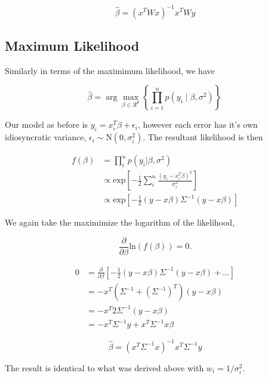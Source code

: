 \documentclass[12pt]{article}
\begin{document}
        \begin{equation}
            \hat{\beta} = (x^T W x)^{-1} x^T W y
        \end{equation}

        \subsection*{Maximum Likelihood}

        Similarly in terms of the maximimum likelihood, we have

        \begin{equation}
            \hat{\beta} = \arg \max_{\beta \in \mathcal{R}^p} \left\{ \prod_{i=1}^n p(y_i \mid \beta, \sigma^2) \right\} \,
        \end{equation}

        Our model as before is $y_i = x_i^T \beta + \epsilon_i$, however each error has it's own idiosyncratic variance, $\epsilon_i \sim \text{N}(0, \sigma_i^2)$. The resultant likelihood is then 

        \begin{align}
            f(\beta) &= \prod_i^n p(y_i|\beta, \sigma^2) \\
             & \propto \text{exp}\left [ -\frac{1}{2} \sum_i^n \frac{(y_i - x_i^T \beta)^2}{\sigma_i^2} \right] \\
             & \propto \text{exp} \left [ -\frac{1}{2}(y - x\beta) \Sigma^{-1} (y - x\beta) \right]
        \end{align}

        We again take the maximimize the logarithm of the likelihood, 

        \begin{equation}
            \frac{\partial}{\partial \beta}\text{ln}(f(\beta)) = 0.
        \end{equation}

        \begin{align}
            0 & = \frac{\partial}{\partial \beta}\left [ -\frac{1}{2}(y - x\beta) \Sigma^{-1} (y - x\beta) + ... \right ] \\
            & = -x^T (\Sigma^{-1}+ (\Sigma^{-1})^T)(y-x\beta)\\
            & = -x^T 2\Sigma^{-1} (y-x\beta)\\
            & = -x^T \Sigma^{-1} y + x^T \Sigma^{-1} x \beta
        \end{align}

        \begin{equation}
            \hat{\beta} = (x^T \Sigma^{-1} x)^{-1} x^T \Sigma^{-1} y
        \end{equation}

        The result is identical to what was derived above with $w_i = 1/\sigma_i^2$. 
\end{document}
